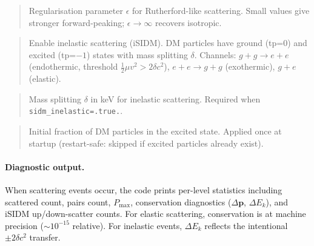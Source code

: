 \label{param:sidm_epsilon}

\begin{quote}
Regularisation parameter $\epsilon$ for Rutherford-like scattering.
Small values give stronger forward-peaking; $\epsilon\to\infty$ recovers isotropic.
\end{quote}

\label{param:sidm_inelastic}

\begin{quote}
Enable inelastic scattering (iSIDM).  DM particles have ground (tp=0)
and excited (tp=$-1$) states with mass splitting $\delta$.
Channels: $g+g\to e+e$ (endothermic, threshold $\frac{1}{2}\mu v^2 > 2\delta c^2$),
$e+e\to g+g$ (exothermic), $g+e$ (elastic).
\end{quote}

\label{param:sidm_delta}

\begin{quote}
Mass splitting $\delta$ in keV for inelastic scattering.
Required when \texttt{sidm\_inelastic=.true.}.
\end{quote}

\label{param:sidm_frac_excited}

\begin{quote}
Initial fraction of DM particles in the excited state.
Applied once at startup (restart-safe: skipped if excited particles already exist).
\end{quote}

\paragraph{Diagnostic output.}
When scattering events occur, the code prints per-level statistics
including scattered count, pairs count, $P_{\max}$, conservation diagnostics
($\Delta\mathbf{p}$, $\Delta E_k$), and iSIDM up/down-scatter counts.
For elastic scattering, conservation is at machine precision
($\sim 10^{-15}$ relative).
For inelastic events, $\Delta E_k$ reflects the intentional $\pm 2\delta c^2$ transfer.


